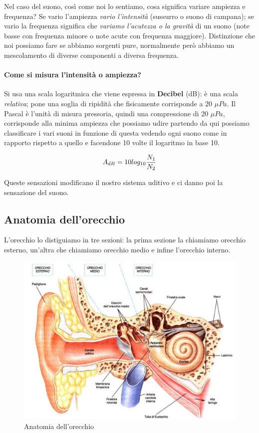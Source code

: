 \documentclass[a4paper,12pt]{article}
\begin{document}
Nel caso del suono, così come noi lo sentiamo, cosa significa variare ampiezza e frequenza? Se vario l'ampiezza \emph{vario l'intensità} (sussurro o suono di campana); se vario la frequenza significa che \emph{variamo l'acutezza o la gravità} di un suono (note basse con frequenza minore o note acute con frequenza maggiore). Distinzione che noi possiamo fare se abbiamo sorgenti pure, normalmente però abbiamo un mescolamento di diverse componenti a diversa frequenza.
 
\paragraph{Come si misura l'intensità o ampiezza?}
 Si usa una scala logaritmica che viene espressa in \textbf{Decibel} (dB): è una scala \emph{relativa}; pone una soglia di ripidità che fisicamente corrisponde a 20 $\mu Pa$. Il Pascal è l'unità di misura pressoria, quindi una compressione di 20 $\mu Pa$, corrisponde alla minima ampiezza che possiamo udire partendo da qui possiamo classificare i vari suoni in funzione di questa vedendo ogni suono come in rapporto rispetto a quello e facendone 10 volte il logaritmo in base 10. 
 
\begin{equation}
\centering
A_{dB}=10 log_{10} \frac{N_{1}}{N_{2}}
\end{equation}

Queste sensazioni modificano il nostro sistema uditivo e ci danno poi la sensazione del suono.

\subsection{Anatomia dell'orecchio}
L'orecchio lo distiguiamo in tre sezioni: la prima sezione la chiamiamo orecchio esterno, un'altra che chiamiamo orecchio medio e infine l'orecchio interno. 

\begin{figure}[H]
\centering
\includegraphics[scale=0.6]{immagine/orecchio.jpg}
\caption{Anatomia dell'orecchio}
\end{figure}
\end{document}
